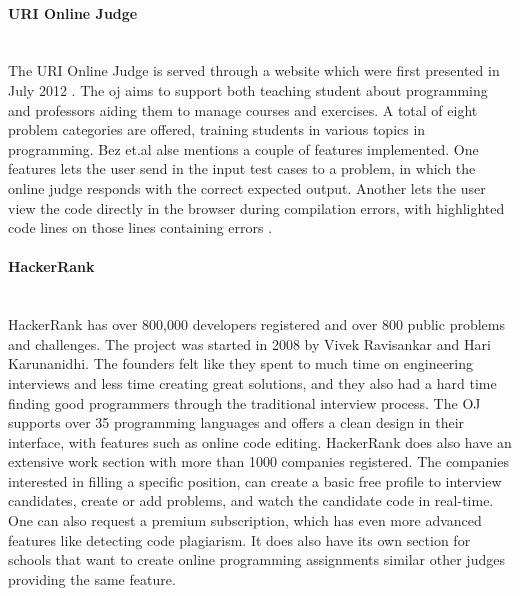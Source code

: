 \paragraph*{URI Online Judge} \hfill \\
The URI Online Judge is served through a website which were first presented in July 2012 \cite{a:Bez2013}. The \gls{oj} aims to support both teaching student about programming and professors aiding them to manage courses and exercises. A total of eight problem categories are offered, training students in various topics in programming. Bez et.al alse mentions a couple of features implemented. One features lets the user send in the input test cases to a problem, in which the online judge responds with the correct expected output. Another lets the user view the code directly in the browser during compilation errors, with highlighted code lines on those lines containing errors \cite{a:Bez2013}.

\paragraph*{HackerRank} \hfill \\
HackerRank \cite{HACKERRANK} has over 800,000 developers registered and over 800 public problems and challenges. The project was started in 2008 by Vivek Ravisankar and Hari Karunanidhi. The founders felt like they spent to much time on engineering interviews and less time creating great solutions, and they also had a hard time finding good programmers through the traditional interview process. The OJ supports over 35 programming languages and offers a clean design in their interface, with features such as online code editing. HackerRank does also have an extensive work section with more than 1000 companies registered. The companies interested in filling a specific position, can create a basic free profile to interview candidates, create or add problems, and watch the candidate code in real-time. One can also request a premium subscription, which has even more advanced features like detecting code plagiarism. It does also have its own section for schools that want to create online programming assignments similar other judges providing the same feature.

